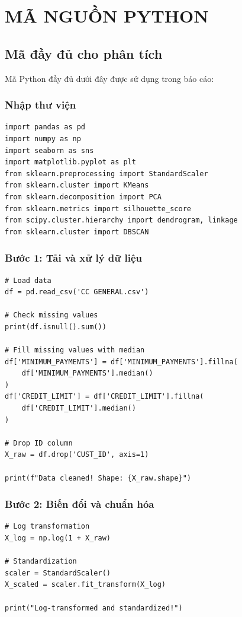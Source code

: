 \appendix
\chapter{MÃ NGUỒN PYTHON}

\section{Mã đầy đủ cho phân tích}

Mã Python đầy đủ dưới đây được sử dụng trong báo cáo:

\lstset{language=Python}

\subsection{Nhập thư viện}

\begin{lstlisting}
import pandas as pd
import numpy as np
import seaborn as sns
import matplotlib.pyplot as plt
from sklearn.preprocessing import StandardScaler
from sklearn.cluster import KMeans
from sklearn.decomposition import PCA
from sklearn.metrics import silhouette_score
from scipy.cluster.hierarchy import dendrogram, linkage
from sklearn.cluster import DBSCAN
\end{lstlisting}

\subsection{Bước 1: Tải và xử lý dữ liệu}

\begin{lstlisting}
# Load data
df = pd.read_csv('CC GENERAL.csv')

# Check missing values
print(df.isnull().sum())

# Fill missing values with median
df['MINIMUM_PAYMENTS'] = df['MINIMUM_PAYMENTS'].fillna(
    df['MINIMUM_PAYMENTS'].median()
)
df['CREDIT_LIMIT'] = df['CREDIT_LIMIT'].fillna(
    df['CREDIT_LIMIT'].median()
)

# Drop ID column
X_raw = df.drop('CUST_ID', axis=1)

print(f"Data cleaned! Shape: {X_raw.shape}")
\end{lstlisting}

\subsection{Bước 2: Biến đổi và chuẩn hóa}

\begin{lstlisting}
# Log transformation
X_log = np.log(1 + X_raw)

# Standardization
scaler = StandardScaler()
X_scaled = scaler.fit_transform(X_log)

print("Log-transformed and standardized!")
\end{lstlisting}

